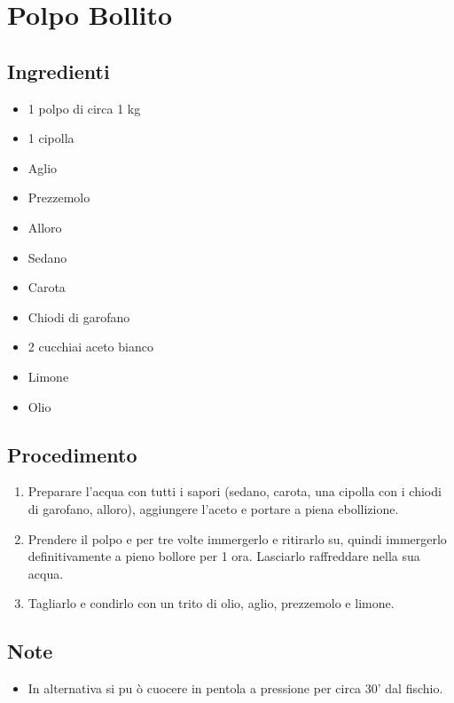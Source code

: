 \section{Polpo Bollito}
\subsection{Ingredienti}
\begin{itemize}
\item 1 polpo di circa 1 kg  
\item 1 cipolla  
\item Aglio  
\item Prezzemolo  
\item Alloro  
\item Sedano  
\item Carota  
\item Chiodi di garofano  
\item 2 cucchiai aceto bianco  
\item Limone  
\item Olio
\end{itemize}
\subsection{Procedimento}
\begin{enumerate}
\item  Preparare l'acqua con tutti i sapori (sedano, carota, una cipolla con i chiodi di garofano, alloro), aggiungere l'aceto e portare a piena ebollizione.  
\item  Prendere il polpo e per tre volte immergerlo e ritirarlo su, quindi immergerlo definitivamente a pieno bollore per 1 ora. Lasciarlo raffreddare nella sua acqua.  
\item  Tagliarlo e condirlo con un trito di olio, aglio, prezzemolo e limone.
\end{enumerate}
\subsection{Note}
\begin{itemize}
\item In alternativa si pu ò cuocere in pentola a pressione per circa 30' dal fischio.
\end{itemize}
